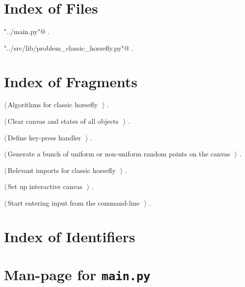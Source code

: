 \documentclass[12pt]{report}
\begin{document}
\begin{appendices}
\chapter{Index of Files}

{\small\begin{list}{}{\setlength{\itemsep}{-\parsep}\setlength{\itemindent}{-\leftmargin}}
\item \verb@"../main.py"@ {\footnotesize {\NWtxtDefBy} .}
\item \verb@"../src/lib/problem_classic_horsefly.py"@ {\footnotesize {\NWtxtDefBy} .}
\end{list}}
\chapter{Index of Fragments}

{\small\begin{list}{}{\setlength{\itemsep}{-\parsep}\setlength{\itemindent}{-\leftmargin}}
\item $\langle\,$Algorithms for classic horsefly\nobreak\ {\footnotesize {}}$\,\rangle$ {\footnotesize {\NWtxtRefIn} .}
\item $\langle\,$Clear canvas and states of all objects\nobreak\ {\footnotesize {}}$\,\rangle$ {\footnotesize {\NWtxtRefIn} .}
\item $\langle\,$Define key-press handler\nobreak\ {\footnotesize {}}$\,\rangle$ {\footnotesize {\NWtxtRefIn} .}
\item $\langle\,$Generate a bunch of uniform or non-uniform random points on the canvas\nobreak\ {\footnotesize {}}$\,\rangle$ {\footnotesize {\NWtxtRefIn} .}
\item $\langle\,$Relevant imports for classic horsefly\nobreak\ {\footnotesize {}}$\,\rangle$ {\footnotesize {\NWtxtRefIn} .}
\item $\langle\,$Set up interactive canvas\nobreak\ {\footnotesize {}}$\,\rangle$ {\footnotesize {\NWtxtRefIn} .}
\item $\langle\,$Start entering input from the command-line\nobreak\ {\footnotesize {}}$\,\rangle$ {\footnotesize {\NWtxtRefIn} .}
\end{list}}
\chapter{Index of Identifiers}
 
\chapter{Man-page for \texttt{main.py}}
\end{appendices}
\end{document}
